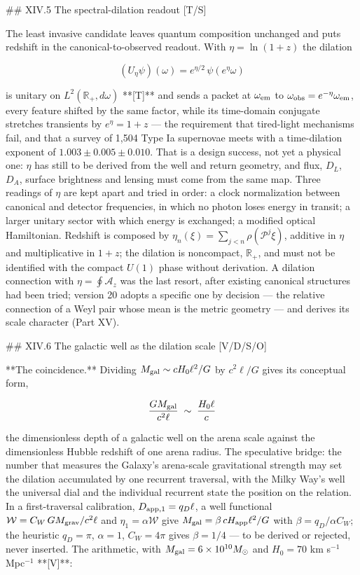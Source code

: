 ## XIV.5 The spectral-dilation readout [T/S]

The least invasive candidate leaves quantum composition unchanged and puts redshift in the canonical-to-observed readout. With $\eta = \ln(1+z)$ the dilation

$$(U_\eta\psi)(\omega) = e^{\eta/2}\,\psi(e^\eta\omega)$$

is unitary on $L^2(\mathbb R_+,d\omega)$ **[T]** and sends a packet at $\omega_{\rm em}$ to $\omega_{\rm obs} = e^{-\eta}\omega_{\rm em}$, every feature shifted by the same factor, while its time-domain conjugate stretches transients by $e^\eta = 1+z$ — the requirement that tired-light mechanisms fail, and that a survey of 1,504 Type Ia supernovae meets with a time-dilation exponent of $1.003\pm0.005\pm0.010$. That is a design success, not yet a physical one: $\eta$ has still to be derived from the well and return geometry, and flux, $D_L$, $D_A$, surface brightness and lensing must come from the same map. Three readings of $\eta$ are kept apart and tried in order: a clock normalization between canonical and detector frequencies, in which no photon loses energy in transit; a larger unitary sector with which energy is exchanged; a modified optical Hamiltonian. Redshift is composed by $\eta_n(\xi) = \sum_{j<n}\rho(\mathscr P^j\xi)$, additive in $\eta$ and multiplicative in $1+z$; the dilation is noncompact, $\mathbb R_+$, and must not be identified with the compact $U(1)$ phase without derivation. A dilation connection with $\eta = \oint\mathcal A_z$ was the last resort, after existing canonical structures had been tried; version 20 adopts a specific one by decision — the relative connection of a Weyl pair whose mean is the metric geometry — and derives its scale character (Part XV).

## XIV.6 The galactic well as the dilation scale [V/D/S/O]

**The coincidence.** Dividing $M_{\rm gal}\sim cH_0\ell^2/G$ by $c^2\ell/G$ gives its conceptual form,

$$\frac{GM_{\rm gal} }{c^2\ell}\;\sim\;\frac{H_0\ell}{c}$$

the dimensionless depth of a galactic well on the arena scale against the dimensionless Hubble redshift of one arena radius. The speculative bridge: the number that measures the Galaxy's arena-scale gravitational strength may set the dilation accumulated by one recurrent traversal, with the Milky Way's well the universal dial and the individual recurrent state the position on the relation. In a first-traversal calibration, $D_{ {\rm app},1} = q_D\ell$, a well functional $\mathcal W = C_W\,GM_{\rm grav}/c^2\ell$ and $\eta_1 = \alpha\mathcal W$ give $M_{\rm gal} = \beta\,cH_{\rm app}\ell^2/G$ with $\beta = q_D/\alpha C_W$; the heuristic $q_D = \pi$, $\alpha = 1$, $C_W = 4\pi$ gives $\beta = 1/4$ — to be derived or rejected, never inserted. The arithmetic, with $M_{\rm gal} = 6\times10^{10}M_\odot$ and $H_0 = 70$ km s$^{-1}$ Mpc$^{-1}$ **[V]**:

